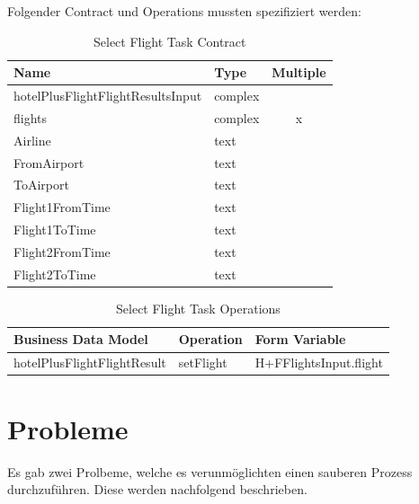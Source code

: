 Folgender Contract und Operations mussten spezifiziert werden:
\begin{table}[H] 
	\caption{Select Flight Task Contract}
	\centering
	
	\begin{tabular}{ | l | l | c | } 
		\hline
		\textbf{Name} & \textbf{Type} & \textbf{Multiple} \\ \hline 
		hotelPlusFlightFlightResultsInput & complex & \\ \hline
		\hspace*{5mm}flights & complex & x \\ \hline
		\hspace*{10mm}Airline & text & \\ \hline
		\hspace*{10mm}FromAirport & text & \\ \hline
		\hspace*{10mm}ToAirport & text & \\ \hline
		\hspace*{10mm}Flight1FromTime & text & \\ \hline
		\hspace*{10mm}Flight1ToTime & text & \\ \hline
		\hspace*{10mm}Flight2FromTime & text & \\ \hline
		\hspace*{10mm}Flight2ToTime & text & \\ \hline
	\end{tabular} 
\end{table}
\begin{table}[H] 
	\caption{Select Flight Task Operations}
	\centering
	
	\begin{tabular}{ | l | l | l | } 
		\hline
		\textbf{Business Data Model} & \textbf{Operation} & \textbf{Form Variable} \\ \hline 
		hotelPlusFlightFlightResult & setFlight & H+FFlightsInput.flight \\ \hline
	\end{tabular} 
\end{table}

\section{Probleme}
Es gab zwei Prolbeme, welche es verunmöglichten einen sauberen Prozess durchzuführen. Diese werden nachfolgend beschrieben.


